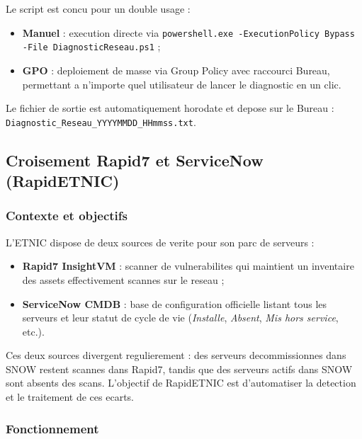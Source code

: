\documentclass{rapport}
\begin{document}
Le script est concu pour un double usage :
\begin{itemize}
  \item \textbf{Manuel} : execution directe via
        \texttt{powershell.exe -ExecutionPolicy Bypass -File
        DiagnosticReseau.ps1} ;
  \item \textbf{GPO} : deploiement de masse via Group Policy avec raccourci
        Bureau, permettant a n'importe quel utilisateur de lancer le
        diagnostic en un clic.
\end{itemize}

Le fichier de sortie est automatiquement horodate et depose sur le Bureau :
\texttt{Diagnostic\_Reseau\_YYYYMMDD\_HHmmss.txt}.

\subsection{Croisement Rapid7 et ServiceNow (RapidETNIC)}

\subsubsection{Contexte et objectifs}

L'ETNIC dispose de deux sources de verite pour son parc de serveurs :

\begin{itemize}
  \item \textbf{Rapid7 InsightVM} : scanner de vulnerabilites qui maintient
        un inventaire des assets effectivement scannes sur le reseau ;
  \item \textbf{ServiceNow CMDB} : base de configuration officielle listant
        tous les serveurs et leur statut de cycle de vie (\textit{Installe},
        \textit{Absent}, \textit{Mis hors service}, etc.).
\end{itemize}

Ces deux sources divergent regulierement : des serveurs decommissionnes
dans SNOW restent scannes dans Rapid7, tandis que des serveurs actifs dans
SNOW sont absents des scans. L'objectif de RapidETNIC est d'automatiser la
detection et le traitement de ces ecarts.

\subsubsection{Fonctionnement}
\end{document}
